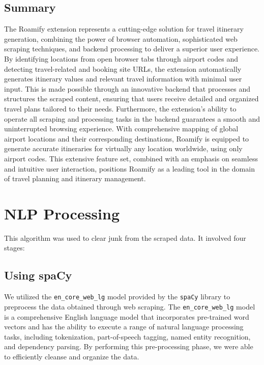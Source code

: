 \documentclass[conference]{IEEEtran}
\begin{document}
\subsection{Summary}
    The Roamify extension represents a cutting-edge solution for travel itinerary generation, combining the power of browser automation, sophisticated web scraping techniques, and backend processing to deliver a superior user experience. By identifying locations from open browser tabs through airport codes and detecting travel-related and booking site URLs, the extension automatically generates itinerary values and relevant travel information with minimal user input. This is made possible through an innovative backend that processes and structures the scraped content, ensuring that users receive detailed and organized travel plans tailored to their needs. Furthermore, the extension’s ability to operate all scraping and processing tasks in the backend guarantees a smooth and uninterrupted browsing experience. With comprehensive mapping of global airport locations and their corresponding destinations, Roamify is equipped to generate accurate itineraries for virtually any location worldwide, using only airport codes. This extensive feature set, combined with an emphasis on seamless and intuitive user interaction, positions Roamify as a leading tool in the domain of travel planning and itinerary management.




\section{NLP Processing}

    This algorithm was used to clear junk from the scraped data. It involved four stages:

    \subsection{Using spaCy}
        We utilized the \texttt{en\_core\_web\_lg} model provided by the \texttt{spaCy} library to preprocess the data obtained through web scraping. The \texttt{en\_core\_web\_lg} model is a comprehensive English language model that incorporates pre-trained word vectors and has the ability to execute a range of natural language processing tasks, including tokenization, part-of-speech tagging, named entity recognition, and dependency parsing. By performing this pre-processing phase, we were able to efficiently cleanse and organize the data.
\end{document}
